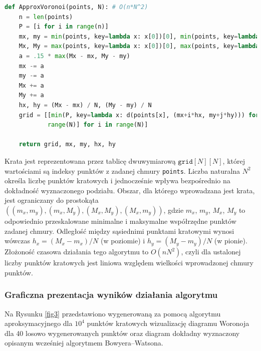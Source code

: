 \documentclass{myclass}
\begin{document}
\begin{small}
    \begin{lstlisting}[language=python, frame=single]
def ApproxVoronoi(points, N): # O(n*N^2)
    n = len(points)
    P = [i for i in range(n)]
    mx, my = min(points, key=lambda x: x[0])[0], min(points, key=lambda x: x[1])[1]
    Mx, My = max(points, key=lambda x: x[0])[0], max(points, key=lambda x: x[1])[1]
    a = .15 * max(Mx - mx, My - my)
    mx -= a
    my -= a
    Mx += a
    My += a
    hx, hy = (Mx - mx) / N, (My - my) / N
    grid = [[min(P, key=lambda x: d(points[x], (mx+i*hx, my+j*hy))) for j in    
            range(N)] for i in range(N)]

    return grid, mx, my, hx, hy
        \end{lstlisting}
\end{small}

Krata jest reprezentowana przez tablicę dwuwymiarową \(\texttt{grid}[N][N]\),
której wartościami są indeksy punktów z zadanej chmury \texttt{points}. Liczba
naturalna \(N^2\) określa liczbę punktów kratowych i jednocześnie wpływa
bezpośrednio na dokładność wyznaczonego podziału. Obszar, dla którego
wprowadzana jest krata, jest ograniczany do prostokąta
\(((m_x,m_y),(m_x,M_y),(M_x,M_y),(M_x,m_y))\), gdzie \(m_x\), \(m_y\), \(M_x\),
\(M_y\) to odpowiednio przeskalowane minimalne i maksymalne współrzędne punktów
zadanej chmury. Odległość między sąsiednimi punktami kratowymi wynosi wówczas
\(h_x = (M_x-m_x)/N\) (w poziomie) i \(h_y = (M_y-m_y)/N\) (w pionie). Złożoność
czasowa działania tego algorytmu to \(O(nN^2)\), czyli dla ustalonej liczby
punktów kratowych jest liniowa względem wielkości wprowadzonej chmury punktów.

\subsubsection{Graficzna prezentacja wyników działania algorytmu}

Na Rysunku \ref{fig3} przedstawiono wygenerowaną za pomocą algorytmu
aproksymacyjnego dla \(10^4\) punktów kratowych wizualizację diagramu Woronoja
dla 40 losowo wygenerowanych punktów oraz diagram dokładny wyznaczony opisanym
wcześniej algorytmem Bowyera--Watsona.
\end{document}
